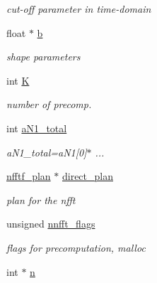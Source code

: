 \begin{DoxyCompactItemize}
\begin{DoxyCompactList}\small\item\em cut-\/off parameter in time-\/domain \end{DoxyCompactList}\item 
\hypertarget{structnnfftf__plan_adbd7faf4a853905d26899885e5ca3b38}{float $\ast$ \hyperlink{structnnfftf__plan_adbd7faf4a853905d26899885e5ca3b38}{b}}\label{structnnfftf__plan_adbd7faf4a853905d26899885e5ca3b38}

\begin{DoxyCompactList}\small\item\em shape parameters \end{DoxyCompactList}\item 
int \hyperlink{structnnfftf__plan_a9d2bd4132187064cf5f6c301f7ce5125}{K}
\begin{DoxyCompactList}\small\item\em number of precomp. \end{DoxyCompactList}\item 
int \hyperlink{structnnfftf__plan_a4bfc7abd18935616365f7925b2994e38}{a\-N1\-\_\-total}
\begin{DoxyCompactList}\small\item\em a\-N1\-\_\-total=a\-N1\mbox{[}0\mbox{]}$\ast$ ... \end{DoxyCompactList}\item 
\hypertarget{structnnfftf__plan_a15fe2e694c1b999008600c1f4a5dc2be}{\hyperlink{structnfftf__plan}{nfftf\-\_\-plan} $\ast$ \hyperlink{structnnfftf__plan_a15fe2e694c1b999008600c1f4a5dc2be}{direct\-\_\-plan}}\label{structnnfftf__plan_a15fe2e694c1b999008600c1f4a5dc2be}

\begin{DoxyCompactList}\small\item\em plan for the nfft \end{DoxyCompactList}\item 
\hypertarget{structnnfftf__plan_acebd9e667d51a5293f977642f031724e}{unsigned \hyperlink{structnnfftf__plan_acebd9e667d51a5293f977642f031724e}{nnfft\-\_\-flags}}\label{structnnfftf__plan_acebd9e667d51a5293f977642f031724e}

\begin{DoxyCompactList}\small\item\em flags for precomputation, malloc \end{DoxyCompactList}\item 
\hypertarget{structnnfftf__plan_ae849996a09be847a35be6c1ea018d988}{int $\ast$ \hyperlink{structnnfftf__plan_ae849996a09be847a35be6c1ea018d988}{n}}\label{structnnfftf__plan_ae849996a09be847a35be6c1ea018d988}


\end{DoxyCompactItemize}

